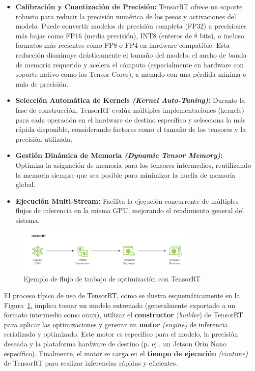 \documentclass[11pt,spanish,listoffigures,listoftables]{tfgetsinf}
\begin{document}
\begin{itemize}
   \item \textbf{Calibración y Cuantización de Precisión:} TensorRT ofrece un soporte robusto para reducir la precisión numérica de los pesos y activaciones del modelo. Puede convertir modelos de precisión completa (FP32) a precisiones más bajas como FP16 (media precisión), INT8 (enteros de 8 bits), o incluso formatos más recientes como FP8 o FP4 en hardware compatible. Esta reducción disminuye drásticamente el tamaño del modelo, el ancho de banda de memoria requerido y acelera el cómputo (especialmente en hardware con soporte nativo como los Tensor Cores), a menudo con una pérdida mínima o nula de precisión.
   \item \textbf{Selección Automática de Kernels \textit{(Kernel Auto-Tuning)}:} Durante la fase de construcción, TensorRT evalúa múltiples implementaciones (kernels) para cada operación en el hardware de destino específico y selecciona la más rápida disponible, considerando factores como el tamaño de los tensores y la precisión utilizada.
   \item \textbf{Gestión Dinámica de Memoria \textit{(Dynamic Tensor Memory)}:} Optimiza la asignación de memoria para los tensores intermedios, reutilizando la memoria siempre que sea posible para minimizar la huella de memoria global.
   \item \textbf{Ejecución Multi-Stream:} Facilita la ejecución concurrente de múltiples flujos de inferencia en la misma GPU, mejorando el rendimiento general del sistema.
\end{itemize}

\begin{figure}[H]
   \centering
   \includegraphics[width=0.8\textwidth]{images/estado_del_arte/TensorRT_pipeline.png}
   \caption[Ejemplo de flujo de trabajo de optimización con TensorRT]{Ejemplo de flujo de trabajo de optimización con TensorRT}
   \label{fig:tensorrt_architecture}
\end{figure}

El proceso típico de uso de TensorRT, como se ilustra esquemáticamente en la Figura~\ref{fig:tensorrt_architecture}, implica tomar un modelo entrenado (generalmente exportado a un formato intermedio como \gls{onnx}\cite{onnx}), utilizar el \textbf{constructor} (\textit{builder}) de TensorRT para aplicar las optimizaciones y generar un \textbf{motor} \textit{(engine)} de inferencia serializado y optimizado. Este motor es específico para el modelo, la precisión deseada y la plataforma hardware de destino (p. ej., un Jetson Orin Nano específico). Finalmente, el motor se carga en el \textbf{tiempo de ejecución} \textit{(runtime)} de TensorRT para realizar inferencias rápidas y eficientes.
\end{document}
